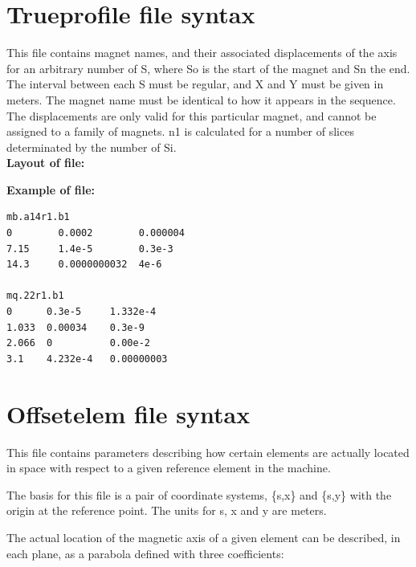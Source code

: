 \section{Trueprofile file syntax}
\label{sec:trueprofile}
This file contains magnet names, and their associated displacements of
the axis for  an arbitrary number of S, where So is the start of the
magnet and Sn the end. The interval between each S must be regular, and
X and Y  must be given in meters. The magnet name must be identical to
how it appears in the  sequence. The displacements are only valid for
this particular magnet, and cannot be  assigned to a family of
magnets. n1 is calculated for a number of slices determinated by the
number of Si. 
\\
\textbf{Layout of file:}

\textbf{Example of file:}
\begin{verbatim}
mb.a14r1.b1
0        0.0002        0.000004
7.15     1.4e-5        0.3e-3
14.3     0.0000000032  4e-6

mq.22r1.b1
0      0.3e-5     1.332e-4
1.033  0.00034    0.3e-9
2.066  0          0.00e-2
3.1    4.232e-4   0.00000003
\end{verbatim}

\section{Offsetelem file syntax}
\label{sec:offsetelem}
This file contains parameters describing how certain elements are
actually located in space with respect to a given reference element in
the machine.  

The basis for this file is a pair of coordinate systems, \{s,x\} and \{s,y\} 
with the origin at the reference point. The units for s, x and y are
meters.

The actual location of the magnetic axis of a given element can be
described, in each plane, as a parabola defined with three coefficients: 

